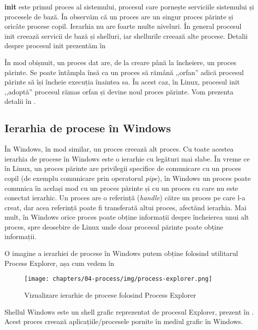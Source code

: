 \textbf{init} este primul proces al sistemului, procesul care
pornește serviciile sistemului și procesele de bază. În  observăm că un
proces are un singur proces părinte și oricâte procese copil. Ierarhia nu are
foarte multe niveluri. În general procesul init creează servicii de bază și
shelluri, iar shellurile creează alte procese. Detalii despre procesul init
prezentăm în 

În mod obișnuit, un proces dat are, de la creare până la încheiere, un proces
părinte. Se poate întâmpla însă ca un proces să rămână ,,orfan'' adică procesul
părinte să își încheie execuția înaintea sa. În acest caz, în Linux, procesul
init ,,adoptă'' procesul rămas orfan și devine noul proces părinte. Vom prezenta
detalii în .

\subsection{Ierarhia de procese în Windows}
\label{sec:process:windows-hierarchy}

În Windows, în mod similar, un proces creează alt proces. Cu toate acestea
ierarhia de procese în Windows este o ierarhie cu legături mai slabe. În vreme
ce în Linux, un proces părinte are privilegii specifice de comunicare cu un
proces copil (de exemplu comunicare prin operatorul \textit{pipe}), în Windows un proces poate comunica în
același mod cu un proces părinte și cu un proces cu care nu este conectat
ierarhic. Un proces are o referință (\textit{handle}) către un proces pe care l-a creat, dar acea referință poate fi transferată altui proces, afectând ierarhia. Mai mult, în Windows orice proces poate obține informații despre
încheierea unui alt proces, spre deosebire de Linux unde doar procesul părinte
poate obține informații.

O imagine a ierarhiei de procese în Windows putem obține folosind utilitarul
Process Explorer, așa cum vedem în 

\begin{figure}[!htbp]
	\centering
	\texttt{[image: chapters/04-process/img/process-explorer.png]}
	\caption{Vizualizare ierarhie de procese folosind Process Explorer}
	\label{fig:process:process-explorer-hierarchy}
\end{figure}

Shellul Windows este un shell grafic reprezentat de procesul Explorer, prezent în . Acest
proces creează aplicațiile/procesele pornite în mediul grafic în Windows.

